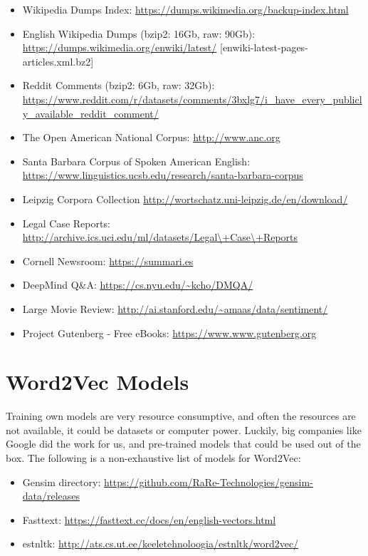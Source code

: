 \begin{itemize}
    \setlength\itemsep{0em}
    \item Wikipedia Dumps Index: \url{https://dumps.wikimedia.org/backup-index.html}
    \item English Wikipedia Dumps (bzip2: 16Gb, raw: 90Gb): \url{https://dumps.wikimedia.org/enwiki/latest/} [enwiki-latest-pages-articles.xml.bz2]
    \item Reddit Comments (bzip2: 6Gb, raw: 32Gb): \url{https://www.reddit.com/r/datasets/comments/3bxlg7/i_have_every_publicly_available_reddit_comment/}
    \item The Open American National Corpus: \url{http://www.anc.org}
    \item Santa Barbara Corpus of Spoken American English: \url{https://www.linguistics.ucsb.edu/research/santa-barbara-corpus}
    \item Leipzig Corpora Collection \url{http://wortschatz.uni-leipzig.de/en/download/}
    \item Legal Case Reports: \url{http://archive.ics.uci.edu/ml/datasets/Legal\+Case\+Reports}
    \item Cornell Newsroom: \url{https://summari.es}
    \item DeepMind Q\&A: \url{https://cs.nyu.edu/\~kcho/DMQA/}
    \item Large Movie Review: \url{http://ai.stanford.edu/\~amaas/data/sentiment/}
    \item Project Gutenberg - Free eBooks: \url{https://www.www.gutenberg.org}
\end{itemize}


\section{Word2Vec Models}
\label{sota:word2vec-models}
Training own models are very resource consumptive, and often the resources are not available, it could be datasets or computer power. Luckily, big companies like Google did the work for us, and pre-trained models that could be used out of the box. The following is a non-exhaustive list of models for Word2Vec:

\begin{itemize}
    \setlength\itemsep{0em}
    \item Gensim directory: \url{https://github.com/RaRe-Technologies/gensim-data/releases}
    \item Fasttext: \url{https://fasttext.cc/docs/en/english-vectors.html}
    \item estnltk: \url{http://ats.cs.ut.ee/keeletehnoloogia/estnltk/word2vec/}
\end{itemize}


